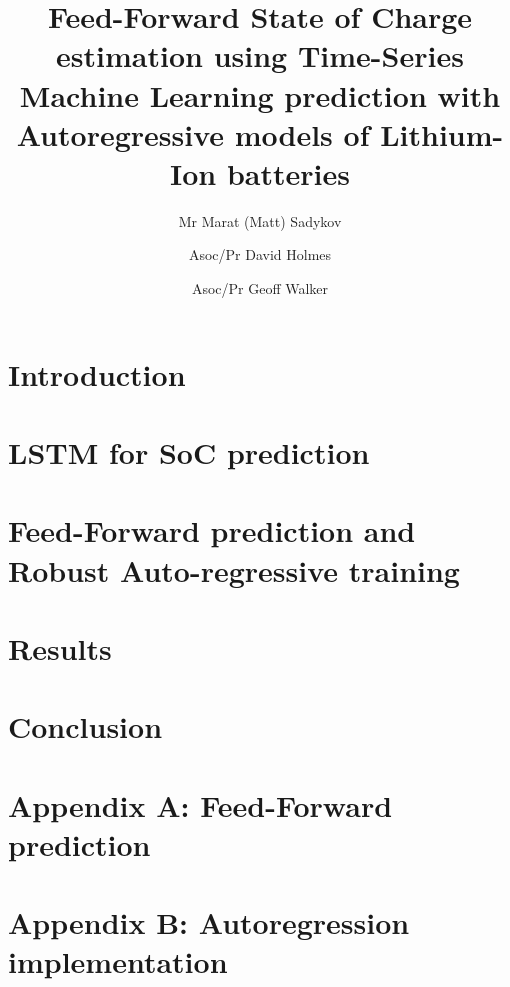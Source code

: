 \documentclass[fleqn,12pt]{olplainarticle}
\title{Feed-Forward State of Charge estimation using Time-Series Machine Learning prediction with Autoregressive models of Lithium-Ion batteries}
\author[1]{Mr Marat (Matt) Sadykov}
\author[2]{Asoc/Pr David Holmes}
\author[3]{Asoc/Pr Geoff Walker}
\affil[1]{Queensland University of Technology}
\begin{document}
\flushbottom
\maketitle
\thispagestyle{empty}
\section{Introduction} \label{sec:Introduction}

\section{LSTM for SoC prediction} \label{sec:layer}

\section{Feed-Forward prediction and Robust Auto-regressive training} \label{sec:feed}

\section{Results} \label{sec:results}

\section{Conclusion} \label{sec:conclussion}




\appendix
\section{Appendix A: Feed-Forward prediction}  \label{app:Feed-Forward}

\section{Appendix B: Autoregression implementation}  \label{app:AutoFeedback}

\end{document}
